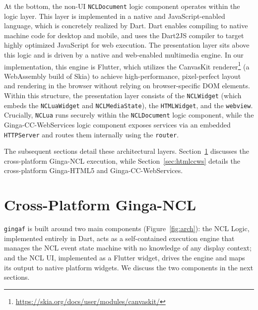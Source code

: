 \documentclass[sigconf]{webmedia}
\newcommand{\projectname}{\texttt{gingaf}}
\begin{document}
At the bottom, the non-UI \texttt{NCLDocument} logic component operates within the logic layer. This layer is implemented in a native and JavaScript-enabled language, which is concretely realized by Dart. Dart enables compiling to native machine code for desktop and mobile, and uses the Dart2JS compiler to target highly optimized JavaScript for web execution. The presentation layer sits above this logic and is driven by a native and web-enabled multimedia engine. In our implementation, this engine is Flutter, which utilizes the CanvasKit renderer\footnote{\url{https://skia.org/docs/user/modules/canvaskit/}} (a WebAssembly build of Skia) to achieve high-performance, pixel-perfect layout and rendering in the browser without relying on browser-specific DOM elements. Within this structure, the presentation layer consists of the \texttt{NCLWidget} (which embeds the \texttt{NCLuaWidget} and \texttt{NCLMediaState}), the \texttt{HTMLWidget}, and the \texttt{webview}. Crucially, \texttt{NCLua} runs securely within the \texttt{NCLDocument} logic component, while the Ginga-CC-WebServices logic component exposes services via an embedded \texttt{HTTPServer} and routes them internally using the \texttt{router}. 



The subsequent sections detail these architectural layers. Section~\ref{sec:nclplayer} discusses the cross-platform Ginga-NCL execution, while Section~\ref{sec:htmlccws} details the cross-platform Ginga-HTML5  and Ginga-CC-WebServices.


\section{Cross-Platform Ginga-NCL}
\label{sec:nclplayer}

\projectname{} is built around two main components (Figure~\ref{fig:arch}): the NCL Logic, implemented entirely in Dart, acts as a self-contained execution engine that manages the NCL event state machine with no knowledge of any display context; and the NCL UI, implemented as a Flutter widget, drives the engine and maps its output to native platform widgets. We discuss the two components in the next sections.
\end{document}
